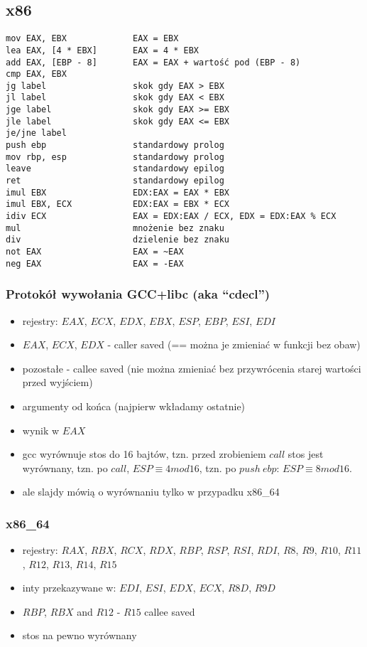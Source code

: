 \subsection{x86}
\begin{verbatim}
mov EAX, EBX             EAX = EBX
lea EAX, [4 * EBX]       EAX = 4 * EBX
add EAX, [EBP - 8]       EAX = EAX + wartość pod (EBP - 8)
cmp EAX, EBX             
jg label                 skok gdy EAX > EBX
jl label                 skok gdy EAX < EBX
jge label                skok gdy EAX >= EBX
jle label                skok gdy EAX <= EBX
je/jne label             
push ebp                 standardowy prolog
mov rbp, esp             standardowy prolog
leave                    standardowy epilog
ret                      standardowy epilog
imul EBX                 EDX:EAX = EAX * EBX
imul EBX, ECX            EDX:EAX = EBX * ECX
idiv ECX                 EAX = EDX:EAX / ECX, EDX = EDX:EAX % ECX
mul                      mnożenie bez znaku
div                      dzielenie bez znaku
not EAX                  EAX = ~EAX
neg EAX                  EAX = -EAX
\end{verbatim}

\subsubsection{Protokół wywołania GCC+libc (aka “cdecl”)}

\begin{itemize}
    \item rejestry: $EAX$, $ECX$, $EDX$, $EBX$, $ESP$, $EBP$, $ESI$, $EDI$
    \item $EAX$, $ECX$, $EDX$ - caller saved (== można je zmieniać w funkcji bez obaw)
    \item pozostałe - callee saved (nie można zmieniać bez przywrócenia starej wartości przed wyjściem)
    \item argumenty od końca (najpierw wkładamy ostatnie)
    \item wynik w $EAX$
    \item gcc wyrównuje stos do 16 bajtów, tzn. przed zrobieniem $call$ stos jest wyrównany, tzn. po $call$, $ESP \equiv 4  mod 16$, tzn. po $push\ ebp$: $ESP \equiv 8 mod 16$.
    \item ale slajdy mówią o wyrównaniu tylko w przypadku x86\_64
\end{itemize}

\subsubsection{x86\_64}
\begin{itemize}
    \item rejestry: $RAX$, $RBX$, $RCX$, $RDX$, $RBP$, $RSP$, $RSI$, $RDI$, $R8$, $R9$, $R10$, $R11$, $R12$, $R13$, $R14$, $R15$
    \item inty przekazywane w: $EDI$, $ESI$, $EDX$, $ECX$, $R8D$, $R9D$
    \item $RBP$, $RBX$ and $R12$ - $R15$ callee saved
    \item stos na pewno wyrównany
\end{itemize}


